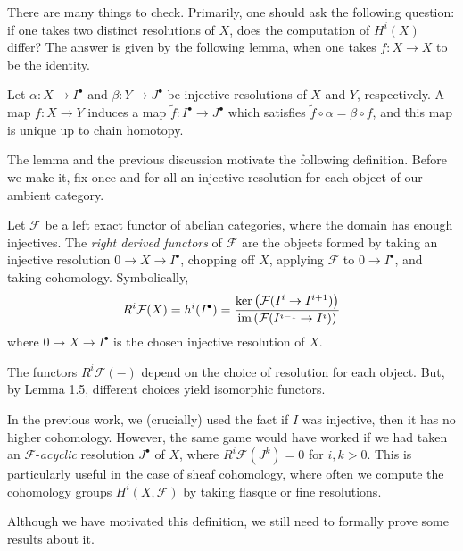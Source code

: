 There are many things to check. Primarily, one should ask the following question: if one takes two distinct resolutions of $X$, does the computation of $H^i(X)$ differ? The answer is given by the following lemma, when one takes $f : X \to X$ to be the identity.

\begin{lemma}
    Let $\alpha : X \to I^\bullet$ and $\beta : Y \to J^\bullet$ be injective resolutions of $X$ and $Y$, respectively. A map $f : X \to Y$ induces a map $\tilde{f} : I^\bullet \to J^\bullet$ which satisfies $\tilde{f} \circ \alpha = \beta \circ f$, and this map is unique up to chain homotopy.
\end{lemma}

The lemma and the previous discussion motivate the following definition. Before we make it, fix once and for all an injective resolution for each object of our ambient category.

\begin{definition}
    Let $\mathcal{F}$ be a left exact functor of abelian categories, where the domain has enough injectives. The \textit{right derived functors} of $\mathcal{F}$ are the objects formed by taking an injective resolution $0 \to X \to I^\bullet$, chopping off $X$, applying $\mathcal{F}$ to $0 \to I^\bullet$, and taking cohomology. Symbolically,
    \[
        R^i\mathcal{F}(X) = h^i(I^\bullet) = \frac{\ker\left( \mathcal{F}(I^i \to I^{i+1})\right)}{\operatorname{im}\left( \mathcal{F}(I^{i-1} \to I^i)\right)}
    \]
    where $0 \to X \to I^\bullet$ is the chosen injective resolution of $X$.
\end{definition}

The functors $R^i \mathcal{F}({-})$ depend on the choice of resolution for each object. But, by Lemma 1.5, different choices yield isomorphic functors.

\begin{remark}
    In the previous work, we (crucially) used the fact if $I$ was injective, then it has no higher cohomology. However, the same game would have worked if we had taken an $\mathcal{F}$-\textit{acyclic} resolution $J^\bullet$ of $X$, where $R^{i}\mathcal{F}(J^k) = 0$ for $i, k > 0$. This is particularly useful in the case of sheaf cohomology, where often we compute the cohomology groups $H^i(X, \mathcal{F})$ by taking flasque or fine resolutions.
\end{remark}

Although we have motivated this definition, we still need to formally prove some results about it.

